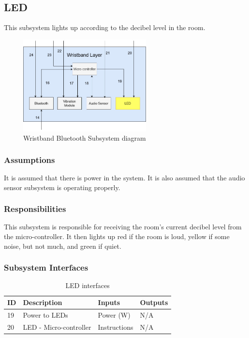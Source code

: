 \subsection{LED}
This subsystem lights up according to the decibel level in the room.

\begin{figure}[h!]
	\centering
 	\includegraphics[width=0.60\textwidth]{images/wristband-led.jpg}
 \caption{Wristband Bluetooth Subsystem diagram}
\end{figure}

\subsubsection{Assumptions}
It is assumed that there is power in the system. It is also assumed that the audio sensor subsystem is operating properly.

\subsubsection{Responsibilities}
This subsystem is responsible for receiving the room's current decibel level from the micro-controller. It then lights up red if the room is loud, yellow if some noise, but not much, and green if quiet.

\subsubsection{Subsystem Interfaces}

\begin {table}[H]
\caption {LED interfaces} 
\begin{center}
    \begin{tabular}{ | p{1cm} | p{6cm} | p{3cm} | p{3cm} |}
    \hline
    ID & Description & Inputs & Outputs \\ \hline
    19 & Power to LEDs & Power (W) &  N/A \\ \hline
    20 & LED - Micro-controller & Instructions & N/A \\ \hline
    \end{tabular}
\end{center}
\end{table}


